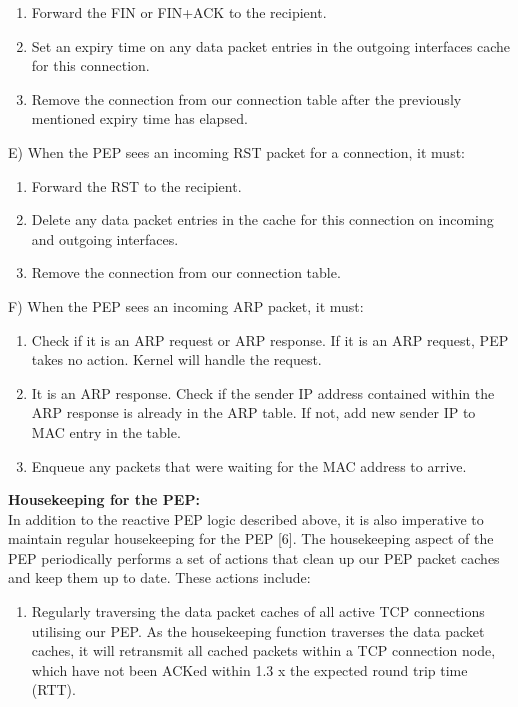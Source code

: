 \begin{enumerate}
\item Forward the FIN or FIN+ACK to the recipient.
\item Set an expiry time on any data packet entries in the outgoing interfaces cache for this connection.
\item Remove the connection from our connection table after the previously mentioned expiry time has elapsed. \\
\end{enumerate}

\noindent E) When the PEP sees an incoming RST packet for a connection, it must:\\

\begin{enumerate}
\item Forward the RST to the recipient.
\item Delete any data packet entries in the cache for this connection on incoming and outgoing interfaces.
\item Remove the connection from our connection table. \\
\end{enumerate}

\noindent F) When the PEP sees an incoming ARP packet, it must:\\

\begin{enumerate}
\item Check if it is an ARP request or ARP response. If it is an ARP request, PEP takes no action. Kernel will handle the request.
\item It is an ARP response. Check if the sender IP address contained within the ARP response is already in the ARP table. If not, add new sender IP to MAC entry in the table.
\item Enqueue any packets that were waiting for the MAC address to arrive. \\
\end{enumerate}


\noindent \textbf{Housekeeping for the PEP:}\\
In addition to the reactive PEP logic described above, it is also imperative to maintain regular housekeeping for the PEP [6]. The housekeeping aspect of the PEP periodically performs a set of actions that clean up our PEP packet caches and keep them up to date. These actions include:  \\ 

\begin{enumerate}
\item Regularly traversing the data packet caches of all active TCP connections utilising our PEP. As the housekeeping function traverses the data packet caches, it will retransmit all cached packets within a TCP connection node, which have not been ACKed within 1.3 x the expected round trip time (RTT). \\
\end{enumerate}

